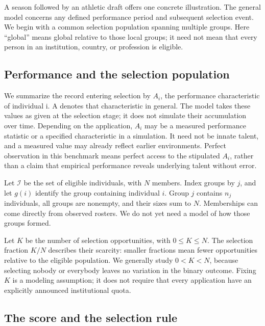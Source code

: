 A season followed by an athletic draft offers one concrete illustration. The general model concerns any defined performance period and subsequent selection event. We begin with a common selection population spanning multiple groups. Here ``global'' means global relative to those local groups; it need not mean that every person in an institution, country, or profession is eligible.

\subsection{Performance and the selection population}\label{performance-and-the-selection-population}

We summarize the record entering selection by \(A_{i}\), the performance characteristic of individual i. A denotes that characteristic in general. The model takes these values as given at the selection stage; it does not simulate their accumulation over time. Depending on the application, \(A_{i}\) may be a measured performance statistic or a specified characteristic in a simulation. It need not be innate talent, and a measured value may already reflect earlier environments. Perfect observation in this benchmark means perfect access to the stipulated \(A_{i}\), rather than a claim that empirical performance reveals underlying talent without error.

Let \(\mathcal I\) be the set of eligible individuals, with \(N\) members. Index groups by \(j\), and let \(g(i)\) identify the group containing individual \(i\). Group \(j\) contains \(n_j\) individuals, all groups are nonempty, and their sizes sum to \(N\). Memberships can come directly from observed rosters. We do not yet need a model of how those groups formed.

Let \(K\) be the number of selection opportunities, with \(0 \leq  K \leq  N\). The selection fraction \(K/N\) describes their scarcity: smaller fractions mean fewer opportunities relative to the eligible population. We generally study \(0 < K < N\), because selecting nobody or everybody leaves no variation in the binary outcome. Fixing \(K\) is a modeling assumption; it does not require that every application have an explicitly announced institutional quota.

\subsection{The score and the selection rule}\label{the-score-and-the-selection-rule}

